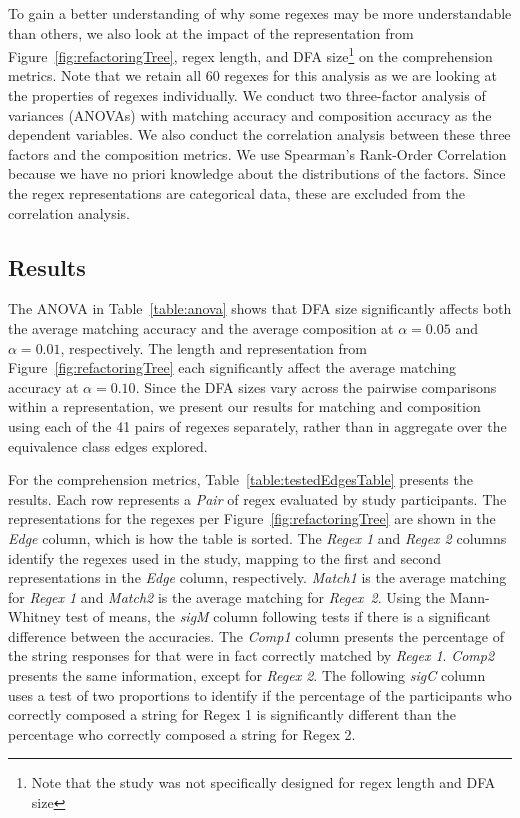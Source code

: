 To gain a better understanding of why some regexes may be more understandable than others, we also look at the impact of the representation from Figure~\ref{fig:refactoringTree}, regex length, and DFA size\footnote{Note that the study was not specifically designed for regex length and DFA size} on the comprehension metrics.
Note that we retain all 60 regexes for this analysis as we are looking at the properties of regexes individually.
We conduct two three-factor analysis of variances (ANOVAs) with matching accuracy and composition accuracy as the dependent variables.
We also conduct the correlation analysis between these three factors and the composition metrics.
We use Spearman's Rank-Order Correlation because we have no priori knowledge about the distributions of the factors.
Since the regex representations are categorical data, these are excluded from the correlation analysis.



\subsection{Results}
The ANOVA in Table~\ref{table:anova} shows that DFA size significantly affects both the average matching accuracy and the average composition at $\alpha = 0.05$ and $\alpha = 0.01$, respectively.
The length and representation from Figure~\ref{fig:refactoringTree} each significantly affect the average matching accuracy at $\alpha = 0.10$.
Since the DFA sizes vary across the pairwise comparisons within a representation, we present our results for matching and composition using each of the 41 pairs of regexes separately, rather than in aggregate over the equivalence class edges explored. %




For the comprehension metrics, Table~\ref{table:testedEdgesTable} presents the results.
Each row represents a {\em Pair} of regex evaluated by study participants.
The representations for the regexes per Figure~\ref{fig:refactoringTree} are shown in the {\em Edge} column, which is how the table is sorted.
The {\em Regex 1} and {\em Regex 2} columns identify the regexes used in the study, mapping to the first and second representations in the {\em Edge} column, respectively.
{\em Match1} is the average matching for {\em Regex 1} and {\em Match2} is the average matching for {\em Regex~2}.
Using the Mann-Whitney test of means, the {\em sigM} column following tests if there is a significant difference between the accuracies.
The {\em Comp1} column presents the percentage of the string responses for that were in fact correctly matched by {\em Regex 1}. {\em Comp2} presents the same information, except for {\em Regex 2}.
The following {\em sigC} column uses a test of two proportions to identify if the percentage of the participants who correctly composed a string for Regex 1 is significantly different than the percentage who correctly composed a string for {Regex 2}.


